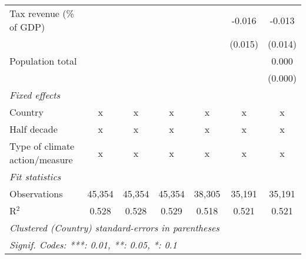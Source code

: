 \begin{tabular}{lcccccc}
   Tax revenue (\% of GDP)                   &              &             &              &               & -0.016        & -0.013\\   
                                             &              &             &              &               & (0.015)       & (0.014)\\   
   Population total                          &              &             &              &               &               & 0.000\\   
                                             &              &             &              &               &               & (0.000)\\   
   \emph{Fixed effects}\\
   Country                                   & x            & x           & x            & x             & x             & x\\  
   Half decade                               & x            & x           & x            & x             & x             & x\\  
   Type of climate action/measure            & x            & x           & x            & x             & x             & x\\  
   \midrule \emph{Fit statistics}\\
   Observations                              & 45,354       & 45,354      & 45,354       & 38,305        & 35,191        & 35,191\\  
   R$^2$                                     & 0.528        & 0.528       & 0.529        & 0.518         & 0.521         & 0.521\\  
   \midrule
   \multicolumn{7}{l}{\emph{Clustered (Country) standard-errors in parentheses}}\\
   \multicolumn{7}{l}{\emph{Signif. Codes: ***: 0.01, **: 0.05, *: 0.1}}\\
\end{tabular}
\par\endgroup


